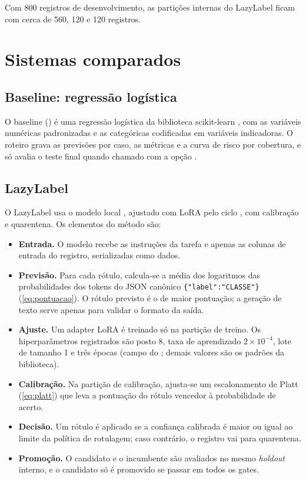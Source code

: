 Com 800 registros de desenvolvimento, as partições internas do LazyLabel ficam com cerca de 560, 120 e 120 registros.

\section{Sistemas comparados}

\subsection{Baseline: regressão logística}

O baseline () é uma regressão logística da biblioteca scikit-learn \cite{pedregosa2011}, com as variáveis numéricas padronizadas e as categóricas codificadas em variáveis indicadoras. O roteiro grava as previsões por caso, as métricas e a curva de risco por cobertura, e só avalia o teste final quando chamado com a opção .

\subsection{LazyLabel}

O LazyLabel usa o modelo local  \cite{qwen25}, ajustado com LoRA \cite{hu2022lora} pelo ciclo , com calibração e quarentena. Os elementos do método são:

\begin{itemize}
  \item \textbf{Entrada.} O modelo recebe as instruções da tarefa e apenas as colunas de entrada do registro, serializadas como dados.
  \item \textbf{Previsão.} Para cada rótulo, calcula-se a média dos logaritmos das probabilidades dos tokens do JSON canônico \texttt{\{"label":"CLASSE"\}} (\autoref{eq:pontuacao}). O rótulo previsto é o de maior pontuação; a geração de texto serve apenas para validar o formato da saída.
  \item \textbf{Ajuste.} Um adapter LoRA é treinado só na partição de treino. Os hiperparâmetros registrados são posto 8, taxa de aprendizado $2\times10^{-4}$, lote de tamanho 1 e três épocas (campo  do ; demais valores são os padrões da biblioteca).
  \item \textbf{Calibração.} Na partição de calibração, ajusta-se um escalonamento de Platt (\autoref{eq:platt}) que leva a pontuação do rótulo vencedor à probabilidade de acerto.
  \item \textbf{Decisão.} Um rótulo é aplicado se a confiança calibrada é maior ou igual ao limite da política de rotulagem; caso contrário, o registro vai para quarentena.
  \item \textbf{Promoção.} O candidato e o incumbente são avaliados no mesmo \emph{holdout} interno, e o candidato só é promovido se passar em todos os gates.
\end{itemize}

